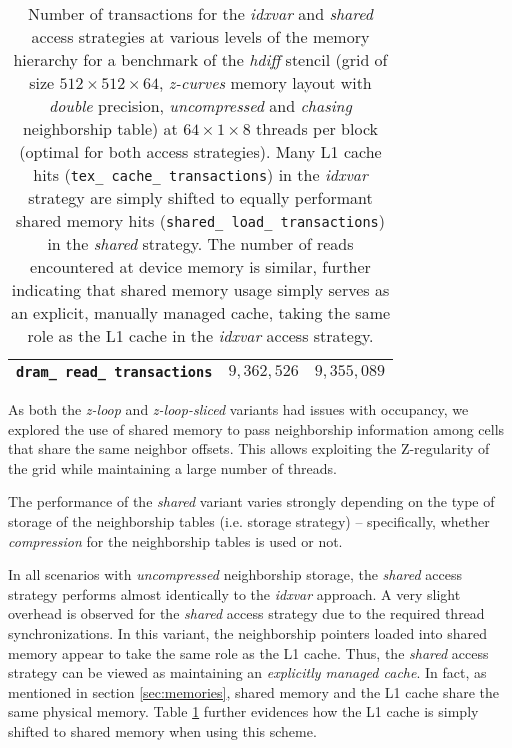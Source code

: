 \begin{table}
\begin{center}
\begin{tabular}{l l l}
        \texttt{dram\_ read\_ transactions} & $9,362,526$ & $9,355,089$ \\
        \hline
    \end{tabular}
	\end{center}
    \caption{\label{tab:access-shared} Number of transactions for the \emph{idxvar} and \emph{shared} access strategies at various levels of the memory hierarchy for a benchmark of the \emph{hdiff} stencil (grid of size $512\times 512\times 64$, \emph{z-curves} memory layout with \emph{double} precision, \emph{uncompressed} and \emph{chasing} neighborship table) at $64\times 1\times 8$ threads per block (optimal for both access strategies). Many L1 cache hits (\texttt{tex\_ cache\_ transactions}) in the \emph{idxvar} strategy are simply shifted to equally performant shared memory hits (\texttt{shared\_ load\_ transactions}) in the \emph{shared} strategy. The number of reads encountered at device memory is similar, further indicating that shared memory usage simply serves as an explicit, manually managed cache, taking the same role as the L1 cache in the \emph{idxvar} access strategy.}
\end{table}

As both the \emph{z-loop} and \emph{z-loop-sliced} variants had issues with occupancy, we explored the use of shared memory to pass neighborship information among cells that share the same neighbor offsets. This allows exploiting the Z-regularity of the grid while maintaining a large number of threads.

The performance of the \emph{shared} variant varies strongly depending on the type of storage of the neighborship tables (i.e. storage strategy) -- specifically, whether \emph{compression} for the neighborship tables is used or not.

In all scenarios with \emph{uncompressed} neighborship storage, the \emph{shared} access strategy performs almost identically to the \emph{idxvar} approach. A very slight overhead is observed for the \emph{shared} access strategy due to the required thread synchronizations. In this variant, the neighborship pointers loaded into shared memory appear to take the same role as the L1 cache. Thus, the \emph{shared} access strategy can be viewed as maintaining an \emph{explicitly managed cache}. In fact, as mentioned in section \ref{sec:memories}, shared memory and the L1 cache share the same physical memory. Table \ref{tab:access-shared} further evidences how the L1 cache is simply shifted to shared memory when using this scheme.

